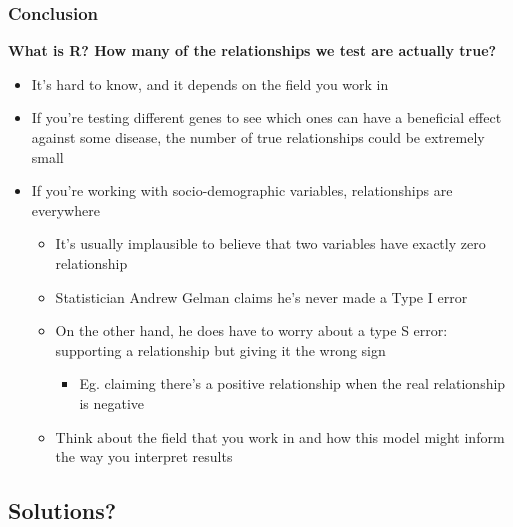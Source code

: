 \documentclass[10pt, block=fill]{beamer}
\begin{document}
\begin{frame}
    \frametitle{Conclusion}
    
    \textbf{What is R? How many of the relationships we test are actually true?}
    \begin{itemize}
        \item It's hard to know, and it depends on the field you work in
        \item If you're testing different genes to see which ones can have a beneficial effect against some disease, the number of true relationships could be extremely small
        \item If you're working with socio-demographic variables, relationships are everywhere
        \begin{itemize}
            \item It's usually implausible to believe that two variables have exactly zero relationship
            \item Statistician Andrew Gelman claims he's never made a Type I error
            \item On the other hand, he does have to worry about a type S error: supporting a relationship but giving it the wrong sign
            \begin{itemize}
                \item Eg. claiming there's a positive relationship when the real relationship is negative
            \end{itemize}
            \item Think about the field that you work in and how this model might inform the way you interpret results
        \end{itemize}
    \end{itemize}
\end{frame}


\subsection{Solutions?}
\end{document}
